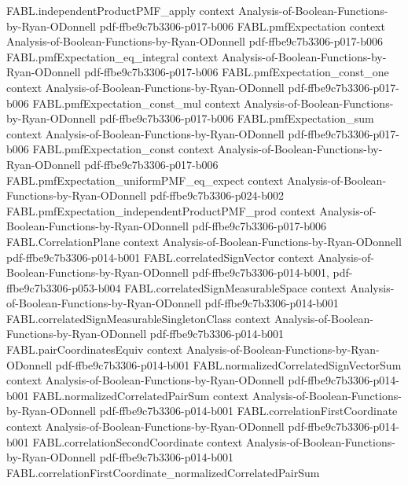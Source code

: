\begin{theorem}
\proofstep
  {FABL.independentProductPMF_apply}
  {context}
  {Analysis-of-Boolean-Functions-by-Ryan-ODonnell}
  {pdf-ffbe9c7b3306-p017-b006}
\proofstep
  {FABL.pmfExpectation}
  {context}
  {Analysis-of-Boolean-Functions-by-Ryan-ODonnell}
  {pdf-ffbe9c7b3306-p017-b006}
\proofstep
  {FABL.pmfExpectation_eq_integral}
  {context}
  {Analysis-of-Boolean-Functions-by-Ryan-ODonnell}
  {pdf-ffbe9c7b3306-p017-b006}
\proofstep
  {FABL.pmfExpectation_const_one}
  {context}
  {Analysis-of-Boolean-Functions-by-Ryan-ODonnell}
  {pdf-ffbe9c7b3306-p017-b006}
\proofstep
  {FABL.pmfExpectation_const_mul}
  {context}
  {Analysis-of-Boolean-Functions-by-Ryan-ODonnell}
  {pdf-ffbe9c7b3306-p017-b006}
\proofstep
  {FABL.pmfExpectation_sum}
  {context}
  {Analysis-of-Boolean-Functions-by-Ryan-ODonnell}
  {pdf-ffbe9c7b3306-p017-b006}
\proofstep
  {FABL.pmfExpectation_const}
  {context}
  {Analysis-of-Boolean-Functions-by-Ryan-ODonnell}
  {pdf-ffbe9c7b3306-p017-b006}
\proofstep
  {FABL.pmfExpectation_uniformPMF_eq_expect}
  {context}
  {Analysis-of-Boolean-Functions-by-Ryan-ODonnell}
  {pdf-ffbe9c7b3306-p024-b002}
\proofstep
  {FABL.pmfExpectation_independentProductPMF_prod}
  {context}
  {Analysis-of-Boolean-Functions-by-Ryan-ODonnell}
  {pdf-ffbe9c7b3306-p017-b006}
\proofstep
  {FABL.CorrelationPlane}
  {context}
  {Analysis-of-Boolean-Functions-by-Ryan-ODonnell}
  {pdf-ffbe9c7b3306-p014-b001}
\proofstep
  {FABL.correlatedSignVector}
  {context}
  {Analysis-of-Boolean-Functions-by-Ryan-ODonnell}
  {pdf-ffbe9c7b3306-p014-b001,
    pdf-ffbe9c7b3306-p053-b004}
\proofstep
  {FABL.correlatedSignMeasurableSpace}
  {context}
  {Analysis-of-Boolean-Functions-by-Ryan-ODonnell}
  {pdf-ffbe9c7b3306-p014-b001}
\proofstep
  {FABL.correlatedSignMeasurableSingletonClass}
  {context}
  {Analysis-of-Boolean-Functions-by-Ryan-ODonnell}
  {pdf-ffbe9c7b3306-p014-b001}
\proofstep
  {FABL.pairCoordinatesEquiv}
  {context}
  {Analysis-of-Boolean-Functions-by-Ryan-ODonnell}
  {pdf-ffbe9c7b3306-p014-b001}
\proofstep
  {FABL.normalizedCorrelatedSignVectorSum}
  {context}
  {Analysis-of-Boolean-Functions-by-Ryan-ODonnell}
  {pdf-ffbe9c7b3306-p014-b001}
\proofstep
  {FABL.normalizedCorrelatedPairSum}
  {context}
  {Analysis-of-Boolean-Functions-by-Ryan-ODonnell}
  {pdf-ffbe9c7b3306-p014-b001}
\proofstep
  {FABL.correlationFirstCoordinate}
  {context}
  {Analysis-of-Boolean-Functions-by-Ryan-ODonnell}
  {pdf-ffbe9c7b3306-p014-b001}
\proofstep
  {FABL.correlationSecondCoordinate}
  {context}
  {Analysis-of-Boolean-Functions-by-Ryan-ODonnell}
  {pdf-ffbe9c7b3306-p014-b001}
\proofstep
  {FABL.correlationFirstCoordinate_normalizedCorrelatedPairSum}

\end{theorem}
